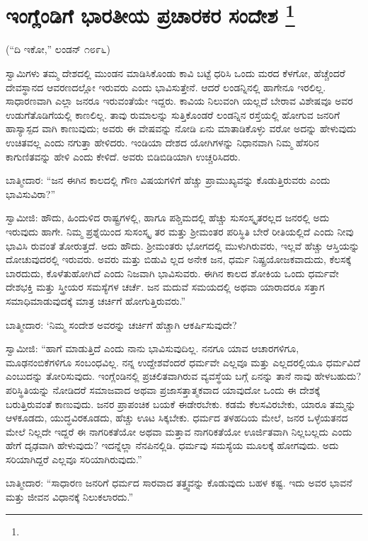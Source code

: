 
\chapter[ಇಂಗ್ಲೆಂಡಿಗೆ ಭಾರತೀಯ ಪ್ರಚಾರಕರ ಸಂದೇಶ ]{ಇಂಗ್ಲೆಂಡಿಗೆ ಭಾರತೀಯ ಪ್ರಚಾರಕರ ಸಂದೇಶ \protect\footnote{}}

\centerline{(“ದಿ ಇಕೋ,” ಲಂಡನ್​ ೧೮೯೬)}

ಸ್ವಾಮಿಗಳು ತಮ್ಮ ದೇಶದಲ್ಲಿ ಮುಂಡನ ಮಾಡಿಸಿಕೊಂಡು ಕಾವಿ ಬಟ್ಟೆ ಧರಿಸಿ ಒಂದು ಮರದ ಕೆಳಗೋ, ಹೆಚ್ಚೆಂದರೆ ದೇವಸ್ಥಾನದ ಆವರಣದಲ್ಲೋ ಇರುವರು ಎಂದು ಭಾವಿಸುತ್ತೇನೆ. ಆದರೆ ಲಂಡನ್ನಿನಲ್ಲಿ ಹಾಗೇನೂ ಇರಲಿಲ್ಲ. ಸಾಧಾರಣವಾಗಿ ಎಲ್ಲಾ ಜನರೂ ಇರುವಂತೆಯೇ ಇದ್ದರು. ಕಾವಿಯ ನಿಲುವಂಗಿ ಯಲ್ಲದೆ ಬೇರಾವ ವಿಶೇಷವೂ ಅವರ ಉಡುಗೆತೊಡಿಗೆಯಲ್ಲಿ ಕಾಣಲಿಲ್ಲ. ತಾವು ರುಮಾಲನ್ನು ಸುತ್ತಿಕೊಂಡರೆ ಲಂಡನ್ನಿನ ರಸ್ತೆಯಲ್ಲಿ ಹೋಗುವ ಜನರಿಗೆ ಹಾಸ್ಯಾಸ್ಪದ ವಾಗಿ ಕಾಣುವುದು; ಅವರು ಈ ವೇಷವನ್ನು ನೋಡಿ ಏನು ಮಾತಾಡಿಕೊಳ್ಳು ವರೋ ಅದನ್ನು ಹೇಳುವುದು ಉಚಿತವಲ್ಲ ಎಂದು ನಗುತ್ತಾ ಹೇಳಿದರು. ಇಂಡಿಯಾ ದೇಶದ ಯೋಗಿಗಳನ್ನು ನಿಧಾನವಾಗಿ ನಿಮ್ಮ ಹೆಸರಿನ ಕಾಗುಣಿತವನ್ನು ಹೇಳಿ ಎಂದು ಕೇಳಿದೆ. ಅವರು ಬಿಡಿಬಿಡಿಯಾಗಿ ಉಚ್ಚರಿಸಿದರು.

ಬಾತ್ಮೀದಾರ: “ಜನ ಈಗಿನ ಕಾಲದಲ್ಲಿ ಗೌಣ ವಿಷಯಗಳಿಗೆ ಹೆಚ್ಚು ಪ್ರಾಮುಖ್ಯವನ್ನು ಕೊಡುತ್ತಿರುವರು ಎಂದು ಭಾವಿಸುವಿರಾ?”

ಸ್ವಾಮೀಜಿ: ಹೌದು, ಹಿಂದುಳಿದ ರಾಷ್ಟ್ರಗಳಲ್ಲಿ, ಹಾಗೂ ಪಶ್ಚಿಮದಲ್ಲಿ ಹೆಚ್ಚು ಸುಸಂಸ್ಕೃತರಲ್ಲದ ಜನರಲ್ಲಿ ಅದು ಇರುವುದು ಹಾಗೇ. ನಿಮ್ಮ ಪ್ರಶ್ನೆಯಿಂದ ಸುಸಂಸ್ಕೃ ತರ ಮತ್ತು ಶ‍್ರೀಮಂತರ ಪರಿಸ್ಥಿತಿ ಬೇರೆ ರೀತಿಯಲ್ಲಿದೆ ಎಂದು ನೀವು ಭಾವಿಸಿ ರುವಂತೆ ತೋರುತ್ತದೆ. ಅದು ಹೌದು. ಶ‍್ರೀಮಂತರು ಭೋಗದಲ್ಲಿ ಮುಳುಗಿರುವರು, ಇಲ್ಲವೆ ಹೆಚ್ಚು ಆಸ್ತಿಯನ್ನು ದೋಚುವುದರಲ್ಲಿ ಇರುವರು. ಅವರು ಮತ್ತು ಬಿಡುವಿ ಲ್ಲದ ಅನೇಕ ಜನ, ಧರ್ಮ ನಿಷ್ಪ್ರಯೋಜಕವಾದುದು, ಕೆಲಸಕ್ಕೆ ಬಾರದುದು, ಕೊಳೆತುಹೋಗಿದೆ ಎಂದು ನಿಜವಾಗಿ ಭಾವಿಸುವರು. ಈಗಿನ ಕಾಲದ ಶೋಕಿಯ ಒಂದು ಧರ್ಮವೇ ದೇಶಭಕ್ತಿ ಮತ್ತು ಸ್ತ್ರೀಯರ ಸಮಸ್ಯೆಗಳ ಚರ್ಚೆ. ಜನ ಮದುವೆ ಸಮಯದಲ್ಲಿ ಅಥವಾ ಯಾರಾದರೂ ಸತ್ತಾಗ ಸಮಾಧಿಮಾಡುವುದಕ್ಕೆ ಮಾತ್ರ ಚರ್ಚಿಗೆ ಹೋಗುತ್ತಿರುವರು.”

ಬಾತ್ಮೀದಾರ: ‘ನಿಮ್ಮ ಸಂದೇಶ ಅವರನ್ನು ಚರ್ಚಿಗೆ ಹೆಚ್ಚಾಗಿ ಆಕರ್ಷಿಸುವುದೇ?

ಸ್ವಾಮೀಜಿ: “ಹಾಗೆ ಮಾಡುತ್ತಿದೆ ಎಂದು ನಾನು ಭಾವಿಸುವುದಿಲ್ಲ. ನನಗೂ ಯಾವ ಆಚಾರಗಳಿಗೂ, ಮೂಢನಂಬಿಕೆಗಳಿಗೂ ಸಂಬಂಧವಿಲ್ಲ. ನನ್ನ ಉದ್ದೇಶವೆಂದರೆ ಧರ್ಮವೇ ಎಲ್ಲವೂ ಮತ್ತು ಎಲ್ಲದರಲ್ಲಿಯೂ ಧರ್ಮವಿದೆ ಎಂಬುದನ್ನು ತೋರಿಸುವುದು. ಇಂಗ್ಲೆಂಡಿನಲ್ಲಿ ಪ್ರಚಲಿತವಾಗಿರುವ ವ್ಯವಸ್ಥೆಯ ಬಗ್ಗೆ ಏನನ್ನು ತಾನೆ ನಾವು ಹೇಳಬಹುದು? ಪರಿಸ್ಥಿತಿಯನ್ನು ನೋಡಿದರೆ ಸಮಾಜವಾದ ಅಥವಾ ಪ್ರಜಾಸತ್ತಾತ್ಮಕವಾದ ಯಾವುದೋ ಒಂದು ಈ ದೇಶಕ್ಕೆ ಬರುತ್ತಿರುವಂತೆ ಕಾಣುವುದು. ಜನರ ಪ್ರಾಪಂಚಿಕ ಬಯಕೆ ಈಡೇರಬೇಕು. ಕಡಮೆ ಕೆಲಸವಿರಬೇಕು, ಯಾರೂ ತಮ್ಮನ್ನು ಆಳಕೂಡದು, ಯುದ್ಧವಿರಕೂಡದು, ಹೆಚ್ಚು ಊಟ ಸಿಕ್ಕಬೇಕು. ಧರ್ಮದ ತಳಹದಿಯ ಮೇಲೆ, ಜನರ ಒಳ್ಳೆಯತನದ ಮೇಲೆ ನಿಲ್ಲದೇ ಇದ್ದರೆ ಈ ನಾಗರಿಕತೆಯೋ ಅಥವಾ ಮತ್ತಾವ ನಾಗರಿಕತೆಯೋ ಊರ್ಜಿತವಾಗಿ ನಿಲ್ಲಬಲ್ಲದು ಎಂದು ಹೇಗೆ ದೃಢವಾಗಿ ಹೇಳುವುದು? ಇದನ್ನೆಲ್ಲಾ ನೆನಪಿನಲ್ಲಿಡಿ. ಧರ್ಮವು ಸಮಸ್ಯೆಯ ಮೂಲಕ್ಕೆ ಹೋಗವುದು. ಅದು ಸರಿಯಾಗಿದ್ದರೆ ಎಲ್ಲವೂ ಸರಿಯಾಗಿರುವುದು.”

ಬಾತ್ಮೀದಾರ: “ಸಾಧಾರಣ ಜನರಿಗೆ ಧರ್ಮದ ಸಾರವಾದ ತತ್ತ್ವವನ್ನು ಕೊಡುವುದು ಬಹಳ ಕಷ್ಟ. ಇದು ಅವರ ಭಾವನೆ ಮತ್ತು ಜೀವನ ವಿಧಾನಕ್ಕೆ ನಿಲುಕಲಾರದು.”

